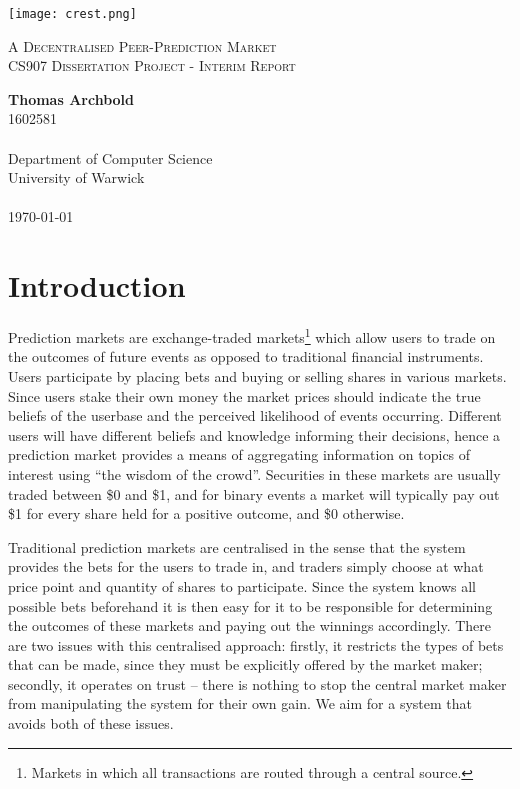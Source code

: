 \documentclass[10pt,a4paper]{article}
\theoremstyle{plain}
\theoremstyle{definition}
\begin{document}
\begin{titlepage}
    \begin{center}

        \vspace*{2cm}
        \texttt{[image: crest.png]}

        \vspace*{1cm}
		{\Large \textsc{A Decentralised Peer-Prediction Market}} \\
		{\textsc{CS907 Dissertation Project - Interim Report}}

        \vspace*{1cm}
        \textbf{Thomas Archbold} \\
		1602581 \\~\\
        Department of Computer Science \\
        University of Warwick \\~\\

		\today

        \vfill

    \end{center}
\end{titlepage}

\section{Introduction}

Prediction markets are exchange-traded markets\footnote{Markets in which all
transactions are routed through a central source.} which allow users to trade
on the outcomes of future events as opposed to traditional financial
instruments. Users participate by placing bets and buying or selling shares in
various markets. Since users stake their own money the market prices should
indicate the true beliefs of the userbase and the perceived likelihood of
events occurring. Different users will have different beliefs and knowledge
informing their decisions, hence a prediction market provides a means of
aggregating information on topics of interest using ``the wisdom of the
crowd''. Securities in these markets are usually traded between \$0 and \$1,
and for binary events a market will typically pay out \$1 for every share held
for a positive outcome, and \$0 otherwise.

Traditional prediction markets are centralised in the sense that the system
provides the bets for the users to trade in, and traders simply choose at what
price point and quantity of shares to participate. Since the system knows all
possible bets beforehand it is then easy for it to be responsible for
determining the outcomes of these markets and paying out the winnings
accordingly. There are two issues with this centralised approach: firstly, it
restricts the types of bets that can be made, since they must be explicitly
offered by the market maker; secondly, it operates on trust -- there is nothing
to stop the central market maker from manipulating the system for their own
gain. We aim for a system that avoids both of these issues.
\end{document}
